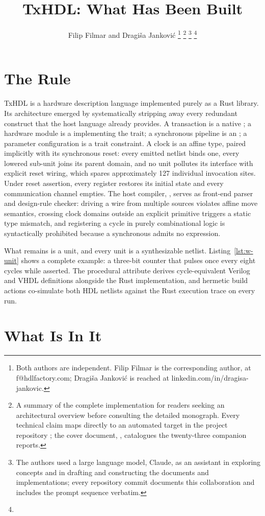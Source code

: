 \documentclass[journal,9pt]{IEEEtran}
\title{TxHDL: What Has Been Built}
\author{Filip Filmar and Dragiša Janković%
\thanks{Both authors are independent. Filip Filmar is the
corresponding author, at f@hdlfactory.com; Dragiša Janković is
reached at linkedin.com/in/dragisa-jankovic.}%
\thanks{A summary of the complete implementation for readers seeking an
architectural overview before consulting the detailed monograph. Every
technical claim maps directly to an automated target in the project
repository \code{HDL/txhdl}; the cover document, \code{//docs:cover},
catalogues the twenty-three companion reports.}%
\thanks{The authors used a large language model, Claude, as an
assistant in exploring concepts and in drafting and constructing
the documents and implementations; every repository commit documents
this collaboration and includes the prompt sequence verbatim.}%
\thanks{\buildstamp}}
\begin{document}
\maketitle

\section{The Rule}

TxHDL is a hardware description language implemented purely as a Rust
library. Its architecture emerged by systematically stripping away every
redundant construct that the host language already provides. A transaction is a
native ; a hardware module is a  implementing the
 trait; a synchronous pipeline is an ; a parameter
configuration is a trait constraint. A clock is an affine type, paired
implicitly with its synchronous reset: every emitted netlist binds one, every
lowered sub-unit joins its parent domain, and no unit pollutes its interface
with explicit reset wiring, which spares approximately 127 individual
 invocation sites. Under reset assertion, every register restores its initial
state and every communication channel empties. The host compiler, ,
serves as front-end parser and design-rule checker: driving a wire from
multiple sources violates affine move semantics, crossing clock domains outside
an explicit  primitive triggers a static type mismatch, and
registering a cycle in purely combinational logic is syntactically prohibited
because a synchronous  admits no  expression.

What remains is a unit, and every unit is a synthesizable netlist.
Listing~\ref{lst:w-unit} shows a complete example: a three-bit counter that
pulses once every eight cycles while asserted. The \code{\#[lower]} procedural
attribute derives cycle-equivalent Verilog and VHDL definitions alongside the
Rust implementation, and hermetic build actions co-simulate both HDL netlists
against the Rust execution trace on every run.



\section{What Is In It}
\end{document}
